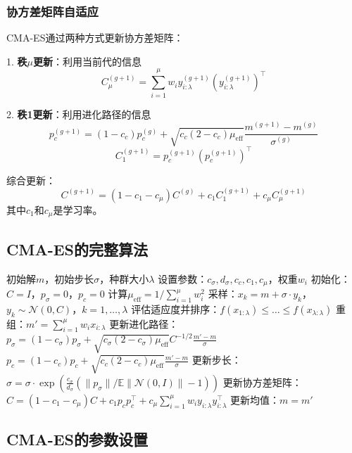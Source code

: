 \subsubsection{协方差矩阵自适应}

CMA-ES通过两种方式更新协方差矩阵：

1. \textbf{秩$\mu$更新}：利用当前代的信息
\[
C_{\mu}^{(g+1)} = \sum_{i=1}^{\mu} w_i y_{i:\lambda}^{(g+1)} (y_{i:\lambda}^{(g+1)})^\top
\]

2. \textbf{秩1更新}：利用进化路径的信息
\[
p_c^{(g+1)} = (1 - c_c) p_c^{(g)} + \sqrt{c_c(2 - c_c)\mu_{\text{eff}}} \frac{m^{(g+1)} - m^{(g)}}{\sigma^{(g)}}
\]
\[
C_1^{(g+1)} = p_c^{(g+1)} (p_c^{(g+1)})^\top
\]

综合更新：
\[
C^{(g+1)} = (1 - c_1 - c_\mu) C^{(g)} + c_1 C_1^{(g+1)} + c_\mu C_{\mu}^{(g+1)}
\]
其中$c_1$和$c_\mu$是学习率。

\subsection{CMA-ES的完整算法}

\begin{algorithm}[H]
\caption{协方差矩阵自适应进化策略（CMA-ES）}
\begin{algorithmic}[1]
\REQUIRE 初始解$m$，初始步长$\sigma$，种群大小$\lambda$
\STATE 设置参数：$c_\sigma, d_\sigma, c_c, c_1, c_\mu$，权重$w_i$
\STATE 初始化：$C = I$，$p_\sigma = 0$，$p_c = 0$
\STATE 计算$\mu_{\text{eff}} = 1/\sum_{i=1}^{\mu} w_i^2$
    \STATE 采样：$x_k = m + \sigma \cdot y_k$，$y_k \sim \mathcal{N}(0, C)$，$k=1,\dots,\lambda$
    \STATE 评估适应度并排序：$f(x_{1:\lambda}) \leq \dots \leq f(x_{\lambda:\lambda})$
    \STATE 重组：$m' = \sum_{i=1}^{\mu} w_i x_{i:\lambda}$
    \STATE 更新进化路径：
    \STATE \quad $p_\sigma = (1-c_\sigma)p_\sigma + \sqrt{c_\sigma(2-c_\sigma)\mu_{\text{eff}}} C^{-1/2} \frac{m'-m}{\sigma}$
    \STATE \quad $p_c = (1-c_c)p_c + \sqrt{c_c(2-c_c)\mu_{\text{eff}}} \frac{m'-m}{\sigma}$
    \STATE 更新步长：$\sigma = \sigma \cdot \exp\left(\frac{c_\sigma}{d_\sigma}(\|p_\sigma\|/\mathbb{E}\|\mathcal{N}(0,I)\| - 1)\right)$
    \STATE 更新协方差矩阵：
    \STATE \quad $C = (1-c_1-c_\mu)C + c_1 p_c p_c^\top + c_\mu \sum_{i=1}^{\mu} w_i y_{i:\lambda} y_{i:\lambda}^\top$
    \STATE 更新均值：$m = m'$
\ENDFOR
\end{algorithmic}
\end{algorithm}

\subsection{CMA-ES的参数设置}


